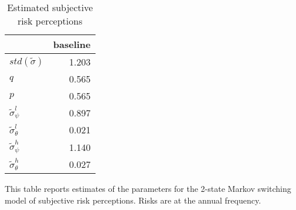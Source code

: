 \clearpage


\begin{table}[p]
\centering
\begin{threeparttable}
\caption{Estimated subjective risk perceptions}
\label{tab:PRMarkovEst}
\begin{tabular}{lr}
\toprule
{} &  baseline \\
\midrule

$std(\tilde\sigma)$&     1.203 \\
$q$                     &     0.565 \\
$p$                     &     0.565 \\
$\tilde \sigma^l_\psi$   &     0.897 \\
$\tilde \sigma^l_\theta$ &     0.021 \\
$\tilde \sigma^h_\psi$   &     1.140 \\
$\tilde \sigma^h_\theta$  &     0.027 \\
\bottomrule
\end{tabular}
	\begin{flushleft}
		{\footnotesize This table reports estimates of the parameters for the 2-state Markov switching model of subjective risk perceptions. Risks are at the annual frequency. }
			\end{flushleft}
\end{threeparttable}
\end{table}


